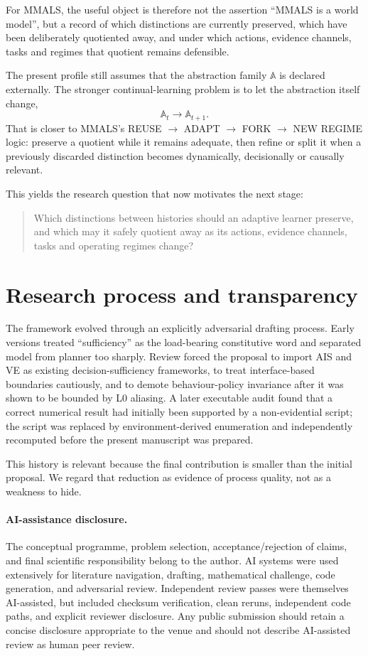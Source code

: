 \documentclass[10pt]{article}
\newcommand{\Aabs}{\mathbb A}
\begin{document}
For MMALS, the useful object is therefore not the assertion ``MMALS is a world model'', but a record of which distinctions are currently preserved, which have been deliberately quotiented away, and under which actions, evidence channels, tasks and regimes that quotient remains defensible.

The present profile still assumes that the abstraction family $\Aabs$ is declared externally. The stronger continual-learning problem is to let the abstraction itself change,
\[
\Aabs_t\rightarrow\Aabs_{t+1}.
\]
That is closer to MMALS's REUSE $\rightarrow$ ADAPT $\rightarrow$ FORK $\rightarrow$ NEW REGIME logic: preserve a quotient while it remains adequate, then refine or split it when a previously discarded distinction becomes dynamically, decisionally or causally relevant.

This yields the research question that now motivates the next stage:
\begin{quote}
Which distinctions between histories should an adaptive learner preserve, and which may it safely quotient away as its actions, evidence channels, tasks and operating regimes change?
\end{quote}

\section{Research process and transparency}

The framework evolved through an explicitly adversarial drafting process. Early versions treated ``sufficiency'' as the load-bearing constitutive word and separated model from planner too sharply. Review forced the proposal to import AIS and VE as existing decision-sufficiency frameworks, to treat interface-based boundaries cautiously, and to demote behaviour-policy invariance after it was shown to be bounded by L0 aliasing. A later executable audit found that a correct numerical result had initially been supported by a non-evidential script; the script was replaced by environment-derived enumeration and independently recomputed before the present manuscript was prepared.

This history is relevant because the final contribution is smaller than the initial proposal. We regard that reduction as evidence of process quality, not as a weakness to hide.

\paragraph{AI-assistance disclosure.}
The conceptual programme, problem selection, acceptance/rejection of claims, and final scientific responsibility belong to the author. AI systems were used extensively for literature navigation, drafting, mathematical challenge, code generation, and adversarial review. Independent review passes were themselves AI-assisted, but included checksum verification, clean reruns, independent code paths, and explicit reviewer disclosure. Any public submission should retain a concise disclosure appropriate to the venue and should not describe AI-assisted review as human peer review.
\end{document}
